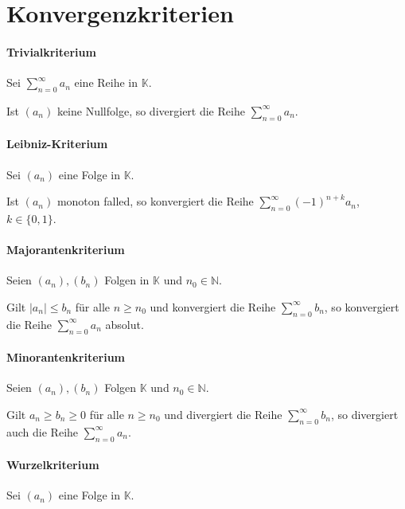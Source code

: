 \documentclass[a4paper, 11pt, accentcolor = tud3b]{tudreport}
\begin{document}
        \section{Konvergenzkriterien}
            \paragraph{Trivialkriterium}
                Sei $ \sum _ { n = 0 } ^ \infty a _ n $ eine Reihe in $ \mathbb{K} $.

                Ist $ (a _ n) $ keine Nullfolge, so divergiert die Reihe $ \sum _ { n = 0 } ^ \infty a _ n $.

            \paragraph{Leibniz-Kriterium}
                Sei $ (a _ n) $ eine Folge in $ \mathbb{K} $.

                Ist $ (a _ n) $ monoton falled, so konvergiert die Reihe $ \sum _ { n = 0 } ^ \infty (-1) ^ { n + k } a _ n $, $ k \in \{ 0, 1 \} $.

            \paragraph{Majorantenkriterium}
                Seien $ (a _ n), (b _ n) $ Folgen in $ \mathbb{K} $ und $ n _ 0 \in \mathbb{N} $.

                Gilt $ \lvert a _ n \rvert \leq b _ n $ für alle $ n \geq n _ 0 $ und konvergiert die Reihe $ \sum _ { n = 0 } ^ \infty b _ n $, so konvergiert die Reihe $ \sum _ { n = 0 } ^ \infty a _ n $ absolut.

            \paragraph{Minorantenkriterium}
                Seien $ (a _ n), (b _ n) $ Folgen $ \mathbb{K} $ und $ n _ 0 \in \mathbb{N} $.

                Gilt $ a _ n \geq b _ n \geq 0 $ für alle $ n \geq n _ 0 $ und divergiert die Reihe $ \sum _ { n = 0 } ^ \infty b _ n $, so divergiert auch die Reihe $ \sum _ { n = 0 } ^ \infty a _ n $.

            \paragraph{Wurzelkriterium}
                Sei $ (a _ n) $ eine Folge in $ \mathbb{K} $.
\end{document}
